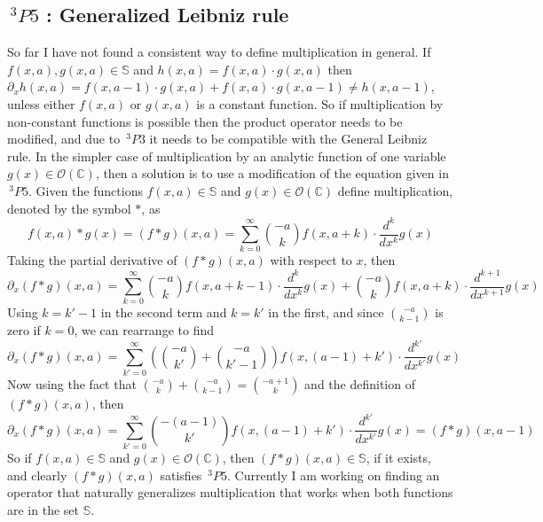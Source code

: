 \documentclass[%
 onecolumn,
 amsmath, amssymb, aps, pra, 10pt
]{revtex4-2}
\begin{document}
\subsection*{$\,^3P5$ : Generalized Leibniz rule}
So far I have not found a consistent way to define multiplication in general. If $f(x, a), g(x, a) \in \mathbb{S}$ and $h(x, a) = f(x, a) \cdot g(x, a)$ then $\partial_x h(x, a) = f(x, a - 1) \cdot g(x, a) + f(x, a) \cdot g(x, a - 1) \neq h(x, a - 1)$, unless either $f(x, a)$ or $g(x, a)$ is a constant function. So if multiplication by non-constant functions is possible then the product operator needs to be modified, and due to $\,^3P3$ it needs to be compatible with the General Leibniz rule. In the simpler case of multiplication by an analytic function of one variable $g(x) \in \mathcal{O}(\mathbb{C})$, then a solution is to use a modification of the equation given in $\,^3P5$. Given the functions $f(x, a) \in \mathbb{S}$ and $g(x) \in \mathcal{O}(\mathbb{C})$ define multiplication, denoted by the symbol $*$, as
\begin{equation}
f(x, a) * g(x) = (f * g)(x, a) = \sum_{k=0}^{\infty} \binom{-a}{k}f(x, a + k) \cdot \frac{d^k}{dx^k} g(x)
\label{multiplication}
\end{equation}
Taking the partial derivative of $(f * g)(x, a)$ with respect to $x$, then
$$\partial_x (f * g)(x, a) = \sum_{k=0}^{\infty} \binom{-a}{k}f(x, a + k - 1) \cdot \frac{d^k}{dx^k} g(x) + \binom{-a}{k}f(x, a + k) \cdot \frac{d^{k + 1}}{dx^{k + 1}} g(x)$$
Using $k = k' - 1$ in the second term and $k = k'$ in the first, and since $\binom{-a}{k-1}$ is zero if $k=0$, we can rearrange to find
$$\partial_x (f * g)(x, a) = \sum_{k'=0}^{\infty} \left( \binom{-a}{k'} + \binom{-a}{k' - 1} \right)f(x, (a - 1) + k') \cdot \frac{d^{k'}}{dx^{k'}} g(x)$$
Now using the fact that $\binom{-a}{k} + \binom{-a}{k - 1} = \binom{-a + 1}{k}$ and the definition of $(f * g)(x, a)$, then 
$$\partial_x (f * g)(x, a) = \sum_{k'=0}^{\infty} \binom{-(a - 1)}{k'}f(x, (a - 1) + k') \cdot \frac{d^{k'}}{dx^{k'}} g(x) = (f * g)(x, a - 1)$$
So if $f(x, a) \in \mathbb{S}$ and $g(x) \in \mathcal{O}(\mathbb{C})$, then $(f * g)(x, a) \in \mathbb{S}$, if it exists, and clearly $(f * g)(x, a)$ satisfies $\,^3P5$. Currently I am working on finding an operator that naturally generalizes multiplication that works when both functions are in the set $\mathbb{S}$.
\end{document}
